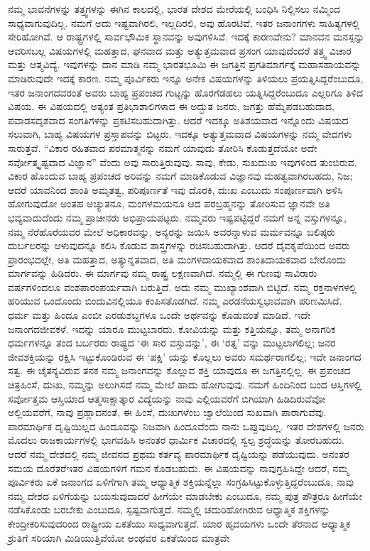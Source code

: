 ನಮ್ಮ ಭಾವನೆಗಳನ್ನು ತತ್ತ್ವಗಳನ್ನು ಈಗಿನ ಕಾಲದಲ್ಲಿ, ಭಾರತ ದೇಶದ ಮೇರೆಯಲ್ಲಿ ಬಂಧಿಸಿ ನಿಲ್ಲಿಸಲು ನಮ್ಮಿಂದ ಸಾಧ್ಯವಾಗುವುದಿಲ್ಲ. ನಮಗೆ ಅದು ಇಷ್ಟವಾಗಿರಲಿ, ಇಲ್ಲದಿರಲಿ, ಅವು ಹೊರಟಿವೆ, ಇತರ ಜನಾಂಗಗಳು ಸಾಹಿತ್ಯಗಳಲ್ಲಿ ಸೇರಿಹೋಗಿವೆ. ಆ ರಾಷ್ಟ್ರಗಳಲ್ಲಿ ಸಾರ್ವಭೌಮಿಕ ಸ್ಥಾನವನ್ನು ಅವು\break ಗಳಿಸಿವೆ. ಇದಕ್ಕೆ ಕಾರಣವೇನು? ಮಾನವನ ಮನಸ್ಸನ್ನು ಆವರಿಸಬಲ್ಲ ವಿಷಯಗಳಲ್ಲಿ ಮಹತ್ತಾದ, ಘನವಾದ ಮತ್ತು ಅತ್ಯುತ್ತಮವಾದ ಪ್ರಸಂಗ ಯಾವುದೆಂದರೆ ತತ್ತ್ವ ವಿಚಾರ ಮತ್ತು ಆತ್ಮವಿದ್ಯೆ. ಇವುಗಳನ್ನು ದಾನ ಮಾಡಿ ನಮ್ಮ ಭಾರತಭೂಮಿ ಈ ಜಗತ್ತಿನ ಪ್ರಗತಿಮಾರ್ಗಕ್ಕೆ ಮಹಾಸಹಾಯವನ್ನು ಮಾಡಿರುವುದೇ ಇದಕ್ಕೆ ಕಾರಣ. ನಮ್ಮ ಪೂರ್ವಿಕರು ಇನ್ನೂ ಅನೇಕ ವಿಷಯಗಳನ್ನು ತಿಳಿಯಲು ಪ್ರಯತ್ನಿಸಿದ್ದರೆಂಬುದೂ, ಇತರ ಜನಾಂಗದವರಂತೆ ಅವರು ಬಾಹ್ಯ ಪ್ರಪಂಚದ ಗುಟ್ಟನ್ನು ಹೊರಗೆಡಹಲು ಯತ್ನಿಸಿದ್ದರೆಂಬುದೂ ಎಲ್ಲರಿಗೂ ತಿಳಿದ ವಿಷಯ. ಈ ವಿಷಯದಲ್ಲಿ ಅತ್ಯಂತ ಪ್ರತಿಭಾಶಾಲಿಗಳಾದ ಈ ಅದ್ಭುತ ಜನರು, ಜಗತ್ತು ಹೆಮ್ಮೆಪಡಬಹುದಾದ, ಪವಾಡಸದೃಶವಾದ ಸಂಗತಿಗಳನ್ನು ಪ್ರಕಟಿಸಬಹು\-ದಾಗಿತ್ತು. ಆದರೆ ಇದಕ್ಕೂ ಅತಿಶಯವಾದ ಇನ್ನೊಂದು ವಿಷಯದ ಸಲುವಾಗಿ, ಬಾಹ್ಯ ವಿಷಯಗಳ ಪ್ರಸ್ತಾಪವನ್ನು ಬಿಟ್ಟರು. ಇದಕ್ಕೂ ಅತ್ಯುತ್ತಮವಾದ ವಿಷಯಗಳನ್ನು ನಮ್ಮ ವೇದಗಳು ಸಾರುತ್ತವೆ. “ವಿಕಾರ ರಹಿತವಾದ ಪರಮಾತ್ಮನನ್ನು ನಮಗೆ ಯಾವುದು ತೋರಿಸಿ ಕೊಡುತ್ತದೆಯೋ ಅದೇ ಸರ್ವೋತ್ಕೃಷ್ಟವಾದ ವಿಜ್ಞಾನ” ವೆಂದು ಅವು ಸಾರುತ್ತಿರುವುವು. ಸಾವು, ಕೇಡು, ಸುಖದುಃಖ ಇವುಗಳಿಂದ ತುಂಬಿರುವ, ವಿಕಾರ ಹೊಂದುವ ಬಾಹ್ಯ ಪ್ರಪಂಚದ ಅರಿವನ್ನು ನಮಗೆ ಮಾಡಿಕೊಡುವ ವಿಜ್ಞಾನವು ಮಹತ್ವವಾಗಿರಬಹದು, ನಿಜ; ಆದರೆ ಯಾವನಿಂದ ಶಾಂತಿ ಅಮೃತತ್ವ, ಪರಿಪೂರ್ಣತೆ ಇವು ದೊರಕಿ, ದುಃಖ ಎಂಬುದು ಸಂಪೂರ್ಣವಾಗಿ ಅಳಿಸಿ ಹೋಗುವುದೋ ಅಂತಹ ಅಚ್ಯುತನೂ, ಮಂಗಳಮಯನೂ ಆದ ಪರಬ್ರಹ್ಮನನ್ನು ತೋರಿಸುವ ಜ್ಞಾನವೇ ಅತಿ ಭವ್ಯವಾದುದೆಂದು ನಮ್ಮ ಪ್ರಾಚೀನರು ಅಭಿಪ್ರಾಯಪಟ್ಟರು. ನಮ್ಮವರು ಇಷ್ಟಪಟ್ಟಿದ್ದರೆ ನಮಗೆ ಅನ್ನ ವಸ್ತುಗಳನ್ನೂ, ನಮ್ಮ ನೆರೆಹೊರೆಯವರ ಮೇಲೆ ಅಧಿಕಾರವನ್ನು, ಅನ್ಯರನ್ನು ಜಯಿಸಿ ಅವರನ್ನಾಳುವ ಮರ್ಮವನ್ನೂ ಬಲಿಷ್ಠರು ದುರ್ಬಲರನ್ನು ಆಳುವುದನ್ನೂ ಕಲಿಸಿ ಕೊಡುವ ಶಾಸ್ತ್ರಗಳನ್ನು ರಚಿಸಬಹುದಾಗಿತ್ತು. ಆದರೆ ದೈವಕೃಪೆಯಿಂದ ಅವರು ಪ್ರಾರಂಭದಲ್ಲೇ, ಅತಿ ಮಹತ್ತಾದ, ಅತ್ಯುನ್ನತವಾದ, ಅತಿ ಮಂಗಳದಾಯಕವಾದ ಶಾಂತಿದಾಯಕವಾದ ಬೇರೊಂದು ಮಾರ್ಗವನ್ನು ಹಿಡಿದರು. ಈ ಮಾರ್ಗವು ನಮ್ಮ ರಾಷ್ಟ್ರ ಲಕ್ಷಣವಾಗಿದೆ. ನಮ್ಮಲ್ಲಿ ಈ ಗುಣವು ಸಾವಿರಾರು ವರ್ಷಗಳಿಂದಲೂ ವಂಶಪಾರಂಪರ್ಯವಾಗಿ ಬರುತ್ತಿದೆ. ಅದು ನಮ್ಮ ಮುಖ್ಯಾಂಶವಾಗಿ ಬಿಟ್ಟಿದೆ. ನಮ್ಮ ರಕ್ತನಾಳಗಳಲ್ಲಿ ಹರಿಯುವ ಒಂದೊಂದು ಬಿಂದುವಿನಲ್ಲಿಯೂ ಕಂಪಿಸತೊಡಗಿದೆ. ನಮ್ಮ ಎರಡನೆಯ\break ಸ್ವಭಾವವಾಗಿ ಪರಿಣಮಿಸಿದೆ. ಧರ್ಮ ಮತ್ತು ಹಿಂದೂ ಎಂಬೀ ಎರಡು\break ಶಬ್ದಗಳೂ ಒಂದೇ ಅರ್ಥವನ್ನು ಕೊಡುವಂತೆ ಮಾಡಿದೆ. ಇದೇ ಜನಾಂಗದ\break ಜೀವಕಳೆ. ಇದನ್ನು ಯಾರೂ ಮುಟ್ಟಬಾರದು. ಕೋವಿಯನ್ನು ಮತ್ತು ಕತ್ತಿಯನ್ನೂ, ತಮ್ಮ ಅನಾಗರಿಕ ಧರ್ಮಗಳನ್ನೂ ತಂದ ಬರ್ಬರರು ರಾಷ್ಟ್ರದ ‘ಈ ಸಾರ ವಸ್ತುವನ್ನು’, ಈ ‘ರತ್ನ’ ವನ್ನು ಮುಟ್ಟಲಾಗಲಿಲ್ಲ; ಜನರ ಜೀವಶಕ್ತಿಯನ್ನು ರಕ್ಷಿಸಿ ಇಟ್ಟುಕೊಂಡಿರುವ ಈ ‘ಪಕ್ಷಿ’ ಯನ್ನು ಕೊಲ್ಲಲು ಅವರು ಸಮರ್ಥರಾಗಲಿಲ್ಲ; ಇದೇ ಜನಾಂಗದ ಸತ್ವ. ಈ ಚೈತನ್ಯವಿರುವ ತನಕ ನಮ್ಮ ಜನಾಂಗವನ್ನು ಕೊಲ್ಲುವ ಶಕ್ತಿ ಯಾವುದೂ ಈ ಜಗತ್ತಿನಲ್ಲಿಲ್ಲ. ಈ ಪ್ರಪಂಚದ ಚಿತ್ರಹಿಂಸೆ, ದುಃಖ, ನಮ್ಮನ್ನು ಅಲುಗಿಸದೆ ನಮ್ಮ ಮೇಲೆ ಹಾದು ಹೋಗುವುವು. ನಮಗೆ ಹಿಂದಿನಿಂದ ಬಂದ ಆಸ್ತಿಗಳಲ್ಲಿ ಸರ್ವೋತ್ತಮ ಆಸ್ತಿಯಾದ ಆತ್ಮಸಾಕ್ಷಾತ್ಕಾರ ವಿದ್ಯೆಯನ್ನು ನಾವು ಎಲ್ಲಿಯವರೆಗೆ ಬಿಗಿಯಾಗಿ ಹಿಡಿದಿರುವೆವೋ ಅಲ್ಲಿಯವರೆಗೆ, ನಾವು ಪ್ರಹ್ಲಾದನಂತೆ, ಈ ಹಿಂಸೆ, ದುಃಖಗಳೆಂಬ ಜ್ವಾಲೆಯಿಂದ ಸುಖವಾಗಿ ಪಾರಾಗುವೆವು. ಪಾರಮಾರ್ಥಿಕ ದೃಷ್ಟಿಯಿಲ್ಲದ ಹಿಂದೂವನ್ನು ನಿಜವಾಗಿ ಹಿಂದೂವೆಂದು ನಾನು ಒಪ್ಪುವುದಿಲ್ಲ. ಇತರ ದೇಶಗಳಲ್ಲಿ ಜನರು ಮೊದಲು ರಾಜಕಾರ್ಯಗಳಲ್ಲಿ ಭಾಗವಹಿಸಿ ಅನಂತರ ಧಾರ್ಮಿಕ ವಿಚಾರದಲ್ಲಿ ಸ್ವಲ್ಪ ಶ್ರದ್ಧೆಯನ್ನು ತೋರಬಹುದು. ಆದರೆ ನಮ್ಮ ದೇಶದಲ್ಲಿ ನಮ್ಮ ಜೀವನದ ಪ್ರಥಮ ಕರ್ತವ್ಯ ಪಾರಮಾರ್ಥಿಕ ದೃಷ್ಟಿಯನ್ನು ಪಡೆಯುವುದು. ಅನಂತರ ಸಮಯ ದೊರೆತರೆ\break ಇತರ ವಿಷಯಗಳಿಗೆ ಗಮನ ಕೊಡಬಹುದು. ಈ ವಿಷಯವನ್ನು ನಾವು\break ಗ್ರಹಿಸಿದ್ದೇ ಆದರೆ, ನಮ್ಮ ಪೂರ್ವಿಕರು ಏಕೆ ಜನಾಂಗದ ಏಳಿಗೆಗಾಗಿ ತಮ್ಮ ಆಧ್ಯಾತ್ಮಿಕ ಶಕ್ತಿಯನ್ನೆಲ್ಲಾ ಸಂಗ್ರಹಿಸಿಟ್ಟುಕೊಳ್ಳುತ್ತಿದ್ದರೆಂಬುದೂ, ನಾವು ನಮ್ಮ ದೇಶದ ಏಳಿಗೆಯನ್ನು ಬಯಸುವುದಾದರೆ ಹೀಗೆಯೇ ಮಾಡಬೇಕು ಎಂಬುದೂ, ನಮ್ಮ ಪುತ್ರ ಪೌತ್ರರೂ ಹೀಗೆಯೇ ನಡೆಸಿಕೊಂಡು ಬರಬೇಕು ಎಂಬುದೂ, ಸ್ಪಷ್ಟವಾಗುತ್ತದೆ. ನಮ್ಮಲ್ಲಿ ಚದುರಿಹೋಗಿರುವ ಆಧ್ಯಾತ್ಮಿಕ ಶಕ್ತಿಗಳನ್ನು ಕೇಂದ್ರೀಕರಿಸುವುದರಿಂದ ರಾಷ್ಟ್ರೀಯ ಏಕತೆಯು ಸಾಧ್ಯವಾಗುತ್ತದೆ. ಯಾರ ಹೃದಯಗಳು ಒಂದೇ ತೆರನಾದ ಆಧ್ಯಾತ್ಮಿಕ ಶ್ರುತಿಗೆ ಸರಿಯಾಗಿ ಮಿಡಿಯುತ್ತಿವೆಯೋ ಅಂಥವರ ಏಕತೆಯಿಂದ ಮಾತ್ರವೇ 